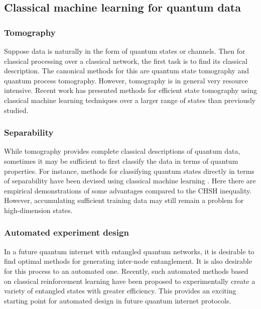 \documentclass[twocolumn, aps, rmp, amsmath, amssymb, nofootinbib, superscriptaddress, longbibliography, floatfix, table-of-contents, eqsecnum]{revtex4}
\begin{document}
\subsection{Classical machine learning for quantum data}

\subsubsection{Tomography}

Suppose data is naturally in the form of quantum states or channels. Then for classical processing over a classical network, the first task is to find its classical description. The canonical methods for this are quantum state tomography and quantum process tomography. However, tomography is in general very resource intensive. Recent work has presented methods for efficient state tomography using classical machine learning techniques \cite{bib:Torlai2017, bib:Han2017} over a larger range of states than previously studied.

\subsubsection{Separability}

While tomography provides complete classical descriptions of quantum data, sometimes it may be sufficient to first classify the data in terms of quantum properties. For instance, methods for classifying quantum states directly in terms of separability have been devised using classical machine learning \cite{bib:Ma2017, bib:Su2017, bib:Gao2018}. Here there are empirical demonstrations of some advantages compared to the CHSH inequality. However, accumulating sufficient training data may still remain a problem for high-dimension states.

\subsubsection{Automated experiment design}

In a future quantum internet with entangled quantum networks, it is desirable to find optimal methods for generating inter-node entanglement. It is also desirable for this process to an automated one. Recently, such automated methods based on classical reinforcement learning \cite{bib:alexey} have been proposed to experimentally create a variety of entangled states with greater efficiency. This provides an exciting starting point for automated design in future quantum internet protocols. 
\end{document}
